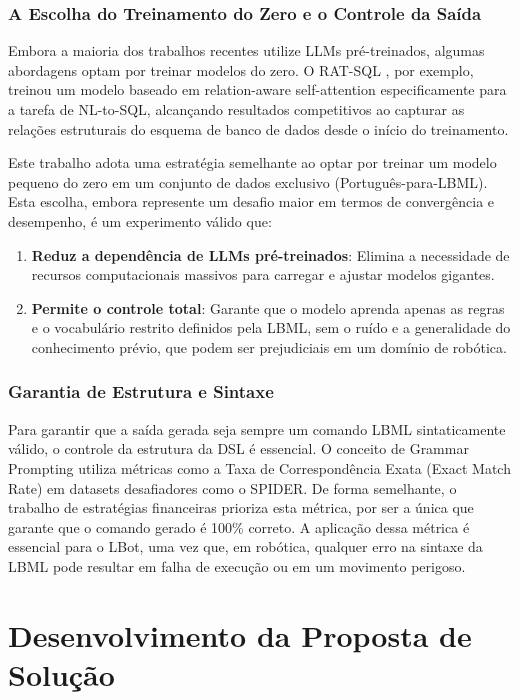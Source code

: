 \documentclass[12pt]{article}
\begin{document}
\subsubsection{A Escolha do Treinamento do Zero e o Controle da Saída}

Embora a maioria dos trabalhos recentes utilize LLMs pré-treinados, algumas abordagens optam por treinar modelos do zero. O RAT-SQL \citep{Wang2021}, por exemplo, treinou um modelo baseado em relation-aware self-attention especificamente para a tarefa de NL-to-SQL, alcançando resultados competitivos ao capturar as relações estruturais do esquema de banco de dados desde o início do treinamento.

Este trabalho adota uma estratégia semelhante ao optar por treinar um modelo pequeno do zero em um conjunto de dados exclusivo (Português-para-LBML). Esta escolha, embora represente um desafio maior em termos de convergência e desempenho, é um experimento válido que:

\begin{enumerate}
\item \textbf{Reduz a dependência de LLMs pré-treinados}: Elimina a necessidade de recursos computacionais massivos para carregar e ajustar modelos gigantes.
\item \textbf{Permite o controle total}: Garante que o modelo aprenda apenas as regras e o vocabulário restrito definidos pela LBML, sem o ruído e a generalidade do conhecimento prévio, que podem ser prejudiciais em um domínio de robótica.
\end{enumerate}

\subsubsection{Garantia de Estrutura e Sintaxe}

Para garantir que a saída gerada seja sempre um comando LBML sintaticamente válido, o controle da estrutura da DSL é essencial. O conceito de Grammar Prompting \citep{Wang2023} utiliza métricas como a Taxa de Correspondência Exata (Exact Match Rate) em datasets desafiadores como o SPIDER. De forma semelhante, o trabalho de estratégias financeiras \citep{Wu2025} prioriza esta métrica, por ser a única que garante que o comando gerado é 100\% correto. A aplicação dessa métrica é essencial para o LBot, uma vez que, em robótica, qualquer erro na sintaxe da LBML pode resultar em falha de execução ou em um movimento perigoso.

\section{Desenvolvimento da Proposta de Solução}
\end{document}
